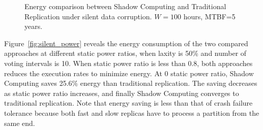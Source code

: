 \begin{figure}[!t]
	\begin{center}
	\end{center}
    \vspace{-0.2in}
	\caption{Energy comparison between Shadow Computing and Traditional Replication under silent data corruption. $W=100$ hours, MTBF=5 years.}
	\label{fig:silent_eval}
    \vspace{-0.2in}
\end{figure}

Figure~\ref{fig:silent_power} reveals the energy consumption of the two compared approaches at different static power ratios, when laxity is 50\% and number of voting intervals is 10. When static power ratio is less than 0.8, both approaches reduces the execution rates to minimize energy. At 0 static power ratio, Shadow Computing saves 25.6\% energy than traditional replication. The saving decreases as static power ratio increases, and finally Shadow Computing converges to traditional replication. Note that energy saving is less than that of crash failure tolerance because both fast and slow replicas have to process a partition from the same end.

